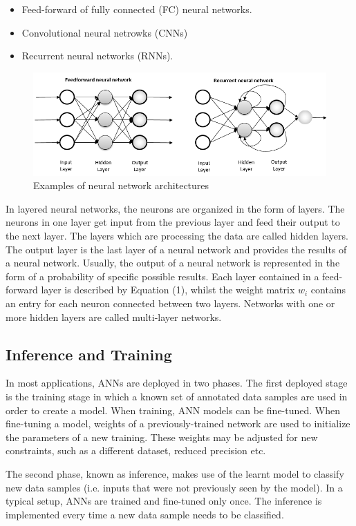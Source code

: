 \begin{itemize}
    \item Feed-forward of fully connected (FC) neural networks.
    \item Convolutional neural netrowks (CNNs)
    \item Recurrent neural networks (RNNs).
\end{itemize}

\begin{figure}[H]
    \centering
    \includegraphics[width=0.8\linewidth]{img/feedForwardRecurrent.png}
    \caption{Examples of neural network architectures\cite{layersFigure}}
    \label{fig:layersFigure}
\end{figure}

In layered neural networks, the neurons are organized in the form of layers. The neurons in one layer get input from the previous layer and feed their output to the next layer. The layers which are processing the data are called hidden layers. The output layer is the last layer of a neural network and provides the results of a neural network. Usually, the output of a neural network is represented in the form of a probability of specific possible results. Each layer contained in a feed-forward layer is described by Equation (1), whilst the weight matrix $w_i$ contains an entry for each neuron connected between two layers. Networks with one or more hidden layers are called multi-layer networks.

\subsection{Inference and Training}

In most applications, ANNs are deployed in two phases. The first deployed stage is the training stage in which a known set of annotated data samples are used in order to create a model. When training, ANN models can be fine-tuned. When fine-tuning a model, weights of a previously-trained network are used to initialize the parameters of a new training. These weights may be adjusted for new constraints, such as a different dataset, reduced precision etc.

The second phase, known as inference, makes use of the learnt model to classify new data samples (i.e. inputs that were not previously seen by the model). In a typical setup, ANNs are trained and fine-tuned only once. The inference is implemented every time a new data sample needs to be classified. 